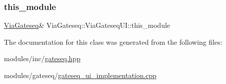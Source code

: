 \subsubsection{\texorpdfstring{this\+\_\+module}{this\_module}}
{\footnotesize\ttfamily \mbox{\hyperlink{class_via_gateseq}{Via\+Gateseq}}\& Via\+Gateseq\+::\+Via\+Gateseq\+U\+I\+::this\+\_\+module}



The documentation for this class was generated from the following files\+:\begin{DoxyCompactItemize}
\item 
modules/inc/\mbox{\hyperlink{gateseq_8hpp}{gateseq.\+hpp}}\item 
modules/gateseq/\mbox{\hyperlink{gateseq__ui__implementation_8cpp}{gateseq\+\_\+ui\+\_\+implementation.\+cpp}}\end{DoxyCompactItemize}

